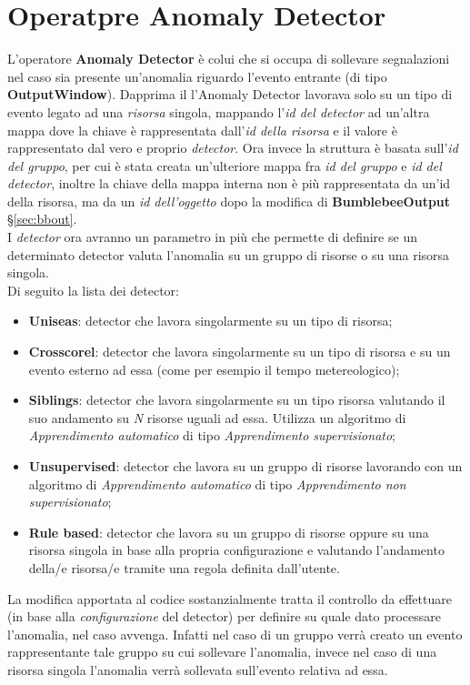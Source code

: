 \section{Operatpre Anomaly Detector}
L'operatore \textbf{Anomaly Detector} è colui che si occupa di sollevare segnalazioni nel caso sia presente un'anomalia riguardo l'evento entrante (di tipo \textbf{OutputWindow}). Dapprima il l'Anomaly Detector lavorava solo su un tipo di evento legato ad una \textit{risorsa} singola, mappando l'\textit{id del detector} ad un'altra mappa dove la chiave è rappresentata dall'\textit{id della risorsa} e il valore è rappresentato dal vero e proprio \textit{detector}. Ora invece la struttura è basata sull'\textit{id del gruppo}, per cui è stata creata un'ulteriore mappa fra \textit{id del gruppo} e \textit{id del detector}, inoltre la chiave della mappa interna non è più rappresentata da un'id della risorsa, ma da un \textit{id dell'oggetto} dopo la modifica di \textbf{BumblebeeOutput} \S\ref{sec:bbout}.\\
I \textit{detector} ora avranno un parametro in più che permette di definire se un determinato detector valuta l'anomalia su un gruppo di risorse o su una risorsa singola.\\
Di seguito la lista dei detector:
\begin{itemize}
	\item{\textbf{Uniseas}: detector che lavora singolarmente su un tipo di risorsa;}
	\item{\textbf{Crosscorel}: detector che lavora singolarmente su un tipo di risorsa e su un evento esterno ad essa (come per esempio il tempo metereologico);}
	\item{\textbf{Siblings}: detector che lavora singolarmente su un tipo risorsa valutando il suo andamento su \textit{N} risorse uguali ad essa. Utilizza un algoritmo di \textit{\gls{Apprendimento automatico}} di tipo \textit{\gls{Apprendimento supervisionato}};}
	\item{\textbf{Unsupervised}: detector che lavora su un gruppo di risorse lavorando con un algoritmo di \textit{\gls{Apprendimento automatico}} di tipo \textit{\gls{Apprendimento non supervisionato}};}
	\item{\textbf{Rule based}: detector che lavora su un gruppo di risorse oppure su una risorsa singola in base alla propria configurazione e valutando l'andamento della/e risorsa/e tramite una regola definita dall'utente.}
\end{itemize}

La modifica apportata al codice sostanzialmente tratta il controllo da effettuare (in base alla \textit{configurazione} del detector) per definire su quale dato processare l'anomalia, nel caso avvenga. Infatti nel caso di un gruppo verrà creato un evento rappresentante tale gruppo su cui sollevare l'anomalia, invece nel caso di una risorsa singola l'anomalia verrà sollevata sull'evento relativa ad essa. 



